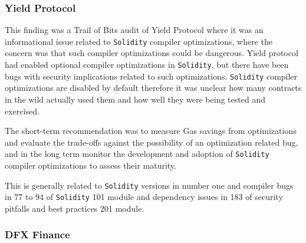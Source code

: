 \subsubsection{Yield Protocol}\label{yield-protocol}

This finding was a Trail of Bits audit of Yield Protocol where it was an
informational issue related to \texttt{Solidity} compiler optimizations,
where the concern was that such compiler optimizations could be
dangerous. Yield protocol had enabled optional compiler optimizations in
\texttt{Solidity}, but there have been bugs with security implications
related to such optimizations. \texttt{Solidity} compiler optimizations
are disabled by default therefore it was unclear how many contracts in
the wild actually used them and how well they were being tested and
exercised.

The short-term recommendation was to measure Gas savings from
optimizations and evaluate the trade-offs against the possibility of an
optimization related bug, and in the long term monitor the development
and adoption of \texttt{Solidity} compiler optimizations to assess their
maturity.

This is generally related to \texttt{Solidity} versions in number one
and compiler bugs in 77 to 94 of \texttt{Solidity} 101 module and
dependency issues in 183 of security pitfalls and best practices 201
module.

\subsubsection{DFX Finance}\label{dfx-finance}

